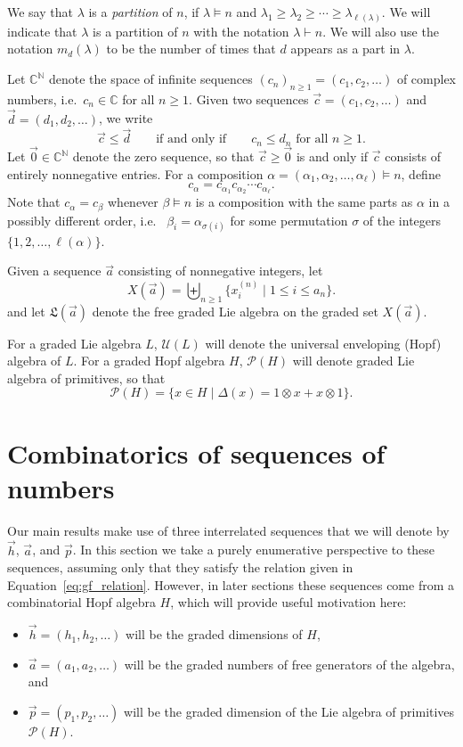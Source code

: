 \documentclass[11pt]{amsart}
\newcommand{\defncolor}{\color{darkred}}
\newcommand{\defn}[1]{{\defncolor\emph{#1}}} %
\theoremstyle{definition}
\numberwithin{equation}{section}
\def\NN{{\mathbb N}}
\def\CC{{\mathbb C}}
\begin{document}
We say that $\lambda$ is a \defn{partition} of $n$, if $\lambda \vDash n$ and
$\lambda_1 \geq \lambda_2 \geq \cdots \geq \lambda_{\ell(\lambda)}$.  We will indicate that $\lambda$ is a partition
of $n$ with the notation $\lambda \vdash n$.  We will also use the notation $m_d(\lambda)$ to be the number of times
that $d$ appears as a part in $\lambda$.

Let $\CC^{\NN}$ denote the space of infinite sequences $(c_{n})_{n \ge 1} = (c_{1}, c_{2}, \ldots)$ of complex numbers, i.e.~$c_{n} \in \CC$ for all $n \ge 1$.  
Given two sequences $\vec{c} = (c_{1}, c_{2}, \ldots)$ and $\vec{d} = (d_{1}, d_{2}, \ldots)$, we write
\[
\vec{c} \le \vec{d} 
\qquad\text{if and only if}\qquad
\text{$c_{n} \le d_{n}$ for all $n \ge 1$}.
\]
Let $\vec{0} \in \CC^{\NN}$ denote the zero sequence, so that $\vec{c} \ge \vec{0}$ is and only if $\vec{c}$ consists of entirely nonnegative entries.  
For a composition $\alpha = (\alpha_{1}, \alpha_{2}, \ldots, \alpha_{\ell}) \vDash n$, define 
\[
c_{\alpha} = c_{\alpha_{1}} c_{\alpha_{2}} \cdots c_{\alpha_{\ell}}.
\]
Note that $c_{\alpha} = c_{\beta}$ whenever $\beta \vDash n$ is a composition with the same parts as $\alpha$ in a possibly different order, i.e.~ $\beta_{i} = \alpha_{\sigma(i)}$ for some permutation $\sigma$ of the integers $\{1,2, \ldots, \ell(\alpha)\}$.


Given a sequence $\vec{a}$ consisting of nonnegative integers, let 
\[
X(\vec{a}) = \biguplus_{n \ge 1} \{x^{(n)}_{i} \;|\; 1 \le i \le a_{n} \}.
\]
and let $\mathfrak{L}(\vec{a})$ denote the free graded Lie algebra on the graded set $X(\vec{a})$.  

For a graded Lie algebra $L$, $\mathcal{U}(L)$ will denote the universal enveloping (Hopf) algebra of $L$.  
For a graded Hopf algebra $H$, $\mathcal{P}(H)$ will denote graded Lie algebra of primitives, so that
\[
\mathcal{P}(H) = \{x \in H \;|\; \Delta(x) = 1 \otimes x + x \otimes 1\}.
\]

\section{Combinatorics of sequences of numbers}

Our main results make use of three interrelated sequences that we will denote by $\vec{h}$, $\vec{a}$, and $\vec{p}$.  
In this section we take a purely enumerative perspective to these sequences, assuming only that they satisfy the relation given in Equation~\eqref{eq:gf_relation}.
However, in later sections these sequences come from a combinatorial Hopf algebra $H$, which will provide useful motivation here:
\begin{itemize}
\item $\vec{h} = (h_{1}, h_{2}, \ldots)$ will be the graded dimensions of $H$,

\item $\vec{a} = (a_{1}, a_{2}, \ldots)$ will be the graded numbers of free generators of the algebra, and 

\item $\vec{p} = (p_{1}, p_{2}, \ldots)$ will be the graded dimension of the Lie algebra of primitives $\mathcal{P}(H)$.

\end{itemize}
\end{document}
